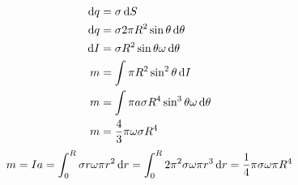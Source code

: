 \begin{align*}
    \dif q&=\sigma\dif S\\
    \dif q&=\sigma 2\pi R^2\sin\theta\dif\theta\\
    \dif I&=\sigma R^2\sin\theta\omega\dif\theta\\
    m&=\int \pi R^2\sin^2\theta\dif I\\
    m&=\int\pi a\sigma R^4\sin^3\theta\omega\dif\theta\\
    m&=\frac43\pi\omega\sigma R^4
\end{align*}
\begin{align*}
    {m}= I{a}=\int_{0}^{R}\sigma r\omega \pi r^2\dif r
    =\int_{0}^{R}2\pi^2\sigma \omega \pi r^3\dif r
    =\frac{1}{4}\pi\sigma \omega \pi R^4
\end{align*}
